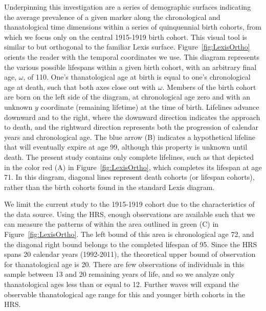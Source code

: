 \documentclass[11pt,oneside]{article} %
\begin{document}
Underpinning this investigation are a series of demographic surfaces indicating
the average prevalence of a given marker along the chronological and
thanatological time dimensions within a series of quinquennial birth cohorts, from which we
focus only on the central 1915-1919 birth cohort.
This visual tool is similar to but orthogonal to the familiar Lexis surface.
Figure~\ref{fig:LexisOrtho} orients the reader with the temporal coordinates we
use. This diagram represents the various possible lifespans within a given birth cohort, with an arbitrary final age, $\omega$, of 110. One's
thanatological age at birth is equal to one's chronological age at death, such
that both axes close out with $\omega$. Members of the birth cohort are born on
the left side of the diagram, at chronological age zero and with an unknown $y$ coordinate (remaining lifetime) at the time of birth.
Lifelines advance downward and to the right, where the downward direction indicates the approach to death, and the
rightward direction represents both the progression of calendar years and
chronological age. The blue arrow (B) indicates a hypothetical lifeline that
will eventually expire at age 99, although this property is unknown until death. The
present study contains only complete lifelines, such as that depicted in the
color red (A) in Figure~\ref{fig:LexisOrtho}, which completes its lifespan at
age 71. In this diagram, diagonal lines represent death cohorts (or lifespan
cohorts), rather than the birth cohorts found in the standard Lexis diagram.

We limit the current study to the 1915-1919 cohort due
to the characteristics of the data source. Using the HRS, enough
observations are available such that we can measure the patterns of
within the area outlined in green (C) in Figure~\ref{fig:LexisOrtho}. The
left bound of this area is chronological age 72, and the diagonal right
bound belongs to the completed lifespan of 95. Since the HRS spans 20 calendar years (1992-2011), the
theoretical upper bound of observation for thanatological age is 20.
There are few observations of individuals in this sample between 13 and 20
remaining years of life, and so we analyze only thanatological ages less than or
equal to 12. Further waves will expand the observable thanatological age range
for this and younger birth cohorts in the HRS. 
\end{document}
